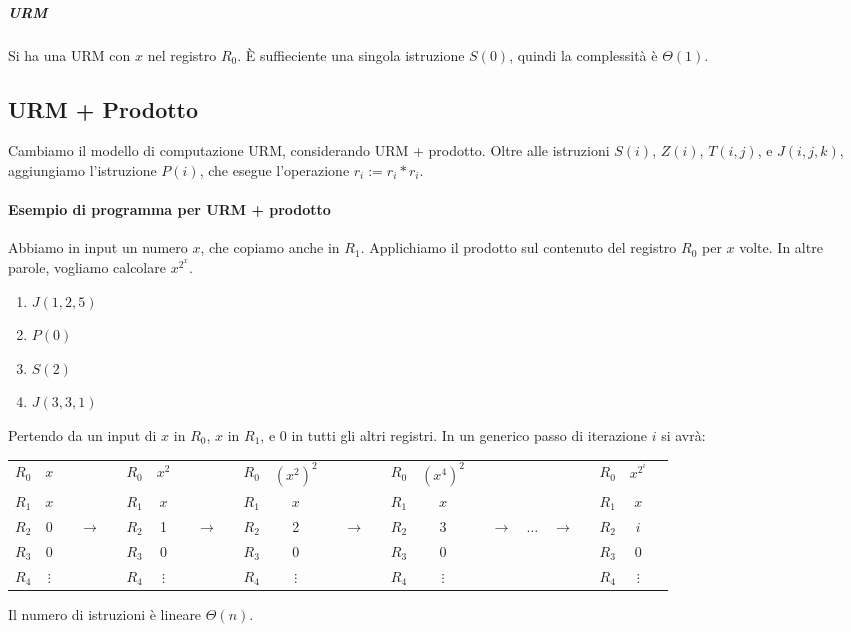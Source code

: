 \subparagraph{URM} Si ha una URM con $x$ nel registro $R_0$. È suffieciente una singola istruzione $S(0)$, quindi la complessità è $\Theta(1)$.


\subsection{URM + Prodotto}
Cambiamo il modello di computazione URM, considerando URM + prodotto. Oltre alle istruzioni $S(i)$, $Z(i)$, $T(i,j)$, e $J(i,j,k)$, aggiungiamo l'istruzione $P(i)$, che esegue l'operazione $r_i:=r_i* r_i$.

\paragraph{Esempio di programma per URM + prodotto} Abbiamo in input un numero $x$, che copiamo anche in $R_1$. Applichiamo il prodotto sul contenuto del registro $R_0$ per $x$ volte. In altre parole, vogliamo calcolare $x^{2^x}$.
\begin{enumerate}
    \item $J(1,2,5)$
    \item $P(0)$
    \item $S(2)$
    \item $J(3,3,1)$
\end{enumerate}
Pertendo da un input di $x$ in $R_0$, $x$ in $R_1$, e $0$ in tutti gli altri registri. In un generico passo di iterazione $i$ si avrà:
\begin{table}[H]
    \centering
    \def\arraystretch{1.3}
    \begin{tabular}{c|c|cc|c|cc|c|cc|c|cccc|c|c}
    \cline{2-2} \cline{5-5} \cline{8-8} \cline{11-11} \cline{16-16}
    $R_0$ & $x$      &       & $R_0$ & $x^2$    &       & $R_0$ & $(x^2)^2$ &       & $R_0$ & $(x^4)^2$ &       &         &       & $R_0$ & $x^{2^i}$  \\ \cline{2-2} \cline{5-5} \cline{8-8} \cline{11-11} \cline{16-16} 
    $R_1$ & $x$      &       & $R_1$ & $x$      &       & $R_1$ & $x$       &       & $R_1$ & $x$       &       &         &       & $R_1$ & $x$      \\ \cline{2-2} \cline{5-5} \cline{8-8} \cline{11-11} \cline{16-16} 
    $R_2$ & 0        & ~ $\to$ ~ & $R_2$ & 1        & ~ $\to$ ~ & $R_2$ & 2         & ~ $\to$ ~ & $R_2$ & 3         & ~ $\to$ & $\dots$ & $\to$ ~ & $R_2$ & $i$    \\ \cline{2-2} \cline{5-5} \cline{8-8} \cline{11-11} \cline{16-16} 
    $R_3$ & 0        &       & $R_3$ & 0        &       & $R_3$ & 0         &       & $R_3$ & 0         &       &         &       & $R_3$ & 0        \\ \cline{2-2} \cline{5-5} \cline{8-8} \cline{11-11} \cline{16-16} 
    $R_4$ & $\vdots$ &       & $R_4$ & $\vdots$ &       & $R_4$ & $\vdots$  &       & $R_4$ & $\vdots$  &       &         &       & $R_4$ & $\vdots$
    \end{tabular}
\end{table}
Il numero di istruzioni è lineare $\Theta(n)$.

